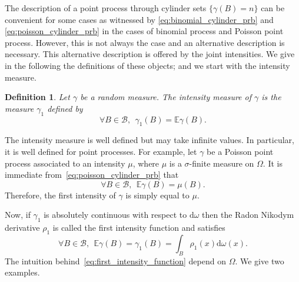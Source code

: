 \documentclass[twoside,11pt]{book}
\newtheorem{definition}{Definition}
\numberwithin{theorem}{chapter}
\numberwithin{definition}{chapter}
\numberwithin{proposition}{chapter}
\numberwithin{corollary}{chapter}
\numberwithin{example}{chapter}
\numberwithin{lemma}{chapter}
\begin{document}
The description of a point process through cylinder sets $\{ \gamma(B) = n \}$ can be convenient for some cases as witnessed by \eqref{eq:binomial_cylinder_prb} and \eqref{eq:poisson_cylinder_prb} in the cases of binomial process and Poisson point process. However, this is not always the case and an alternative description is necessary.
This alternative description is offered by the joint intensities. We give in  the following the definitions of these objects; and we start with the intensity measure.  
\begin{definition}
Let $\gamma$ be a random measure. The intensity measure of $\gamma$ is the measure $\gamma_{1}$ defined by
\begin{equation}
\forall B \in \mathcal{B}, \:\: \gamma_{1}(B) = \mathbb{E} \gamma(B).
\end{equation}
\end{definition}
The intensity measure is well defined but may take infinite values. In particular, it is well defined for point processes. For example, let $\gamma$ be a Poisson point process associated to an intensity $\mu$, where $\mu$ is a $\sigma$-finite measure on $\Omega$. It is immediate from~\eqref{eq:poisson_cylinder_prb} that 
\begin{equation}
\forall B \in \mathcal{B}, \:\: \mathbb{E}\gamma(B) = \mu(B).
\end{equation}
Therefore, the first intensity of $\gamma$ is simply equal to $\mu$.





Now, if $\gamma_{1}$ is absolutely continuous with respect to $\mathrm{d}\omega$ then the Radon Nikodym derivative $\rho_{1}$ is called the first intensity function and satisfies
\begin{equation}\label{eq:first_intensity_function}
\forall B \in \mathcal{B}, \:\:\mathbb{E} \gamma(B) = \gamma_1(B) = \int_{B} \rho_{1}(x) \mathrm{d}\omega(x). 
\end{equation}
The intuition behind~\eqref{eq:first_intensity_function} depend on $\Omega$. We give two examples.
\end{document}
